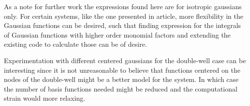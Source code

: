     As a note for further work the expressions found here are for isotropic
    gaussians only. For certain systems, like the one presented in
    article\cite{nonIsoGauss}, more flexibility in the Gaussian functions can
    be desired, such that finding expression for the integrals of Gaussian
    functions with higher order monomial factors and extending the existing
    code to calculate those can be of desire.

    Experimentation with different centered gaussians for the double-well case
    can be interesting since it is not unreasonable to believe that functions
    centered on the nodes of the double-well might be a better model for the
    system. In which case the number of basis functions needed might be reduced
    and the computational strain would more relaxing.
